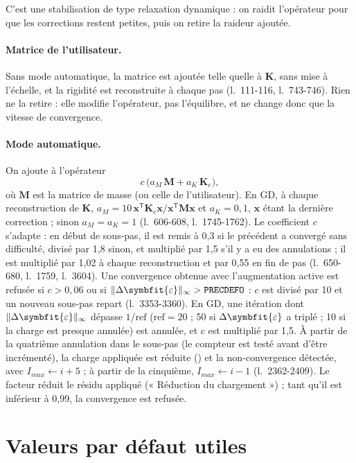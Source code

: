 \documentclass[11pt,a4paper]{article}
\numberwithin{equation}{section}
\newcommand{\src}[1]{\texttt{\detokenize{#1}}}          %
\newcommand{\lig}[1]{l.~#1}
\newcommand{\vc}[1]{\symbf{#1}}                         %
\newcommand{\Deps}{\Delta\symbfit{\varepsilon}}
\newcommand{\norminf}[1]{\lVert #1\rVert_{\infty}}
\begin{document}
C'est une stabilisation de type relaxation dynamique : on raidit l'opérateur pour que les corrections restent petites, puis on retire la raideur ajoutée.

\paragraph{Matrice de l'utilisateur.}
Sans mode automatique, la matrice \src{RIGIDITE_AUGMENTEE} est ajoutée telle quelle à $\vc K$, sans mise à l'échelle, et la rigidité est reconstruite à chaque pas (\lig{111-116}, \lig{743-746}).
Rien ne la retire : elle modifie l'opérateur, pas l'équilibre, et ne change donc que la vitesse de convergence.

\paragraph{Mode automatique.}
On ajoute à l'opérateur
\begin{equation}
c\,\big(a_M\,\vc M + a_K\,\vc K_e\big),
\end{equation}
où $\vc M$ est la matrice de masse (ou celle de l'utilisateur).
En GD, à chaque reconstruction de $\vc K$, $a_M = 10\,\vc x^{\mathsf T}\vc K_e\vc x / \vc x^{\mathsf T}\vc M\vc x$ et $a_K = 0{,}1$, $\vc x$ étant la dernière correction ; sinon $a_M = a_K = 1$ (\lig{606-608}, \lig{1745-1762}).
Le coefficient $c$ s'adapte : en début de sous-pas, il est remis à 0,3 si le précédent a convergé sans difficulté, divisé par 1,8 sinon, et multiplié par 1,5 s'il y a eu des annulations ; il est multiplié par 1,02 à chaque reconstruction et par 0,55 en fin de pas (\lig{650-680}, \lig{1759}, \lig{3604}).
Une convergence obtenue avec l'augmentation active est refusée si $c > 0{,}06$ ou si $\norminf{\Deps} > \src{PRECDEFO}$ : $c$ est divisé par 10 et un nouveau sous-pas repart (\lig{3353-3360}).
En GD, une itération dont $\norminf{\Deps}$ dépasse $1/\mathrm{ref}$ ($\mathrm{ref} = 20$ ; 50 si $\Deps$ a triplé ; 10 si la charge est presque annulée) est annulée, et $c$ est multiplié par 1,5. À partir de la quatrième annulation dans le sous-pas (le compteur est testé avant d'être incrémenté), la charge appliquée est réduite (\src{resmul}) et la non-convergence détectée, avec $I_{max} \gets i + 5$ ; à partir de la cinquième, $I_{max} \gets i - 1$ (\lig{2362-2409}).
Le facteur \src{resmul} réduit le résidu appliqué (« Réduction du chargement ») ; tant qu'il est inférieur à 0,99, la convergence est refusée.
\section{Valeurs par défaut utiles}
\label{sec:defauts}
\end{document}
